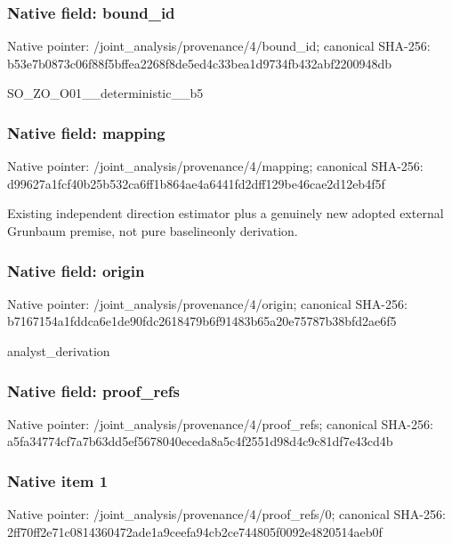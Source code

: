 \documentclass[10pt,a4paper]{article}
\begin{document}
\subsubsection{Native field: bound\_id}


Native pointer: /joint\_analysis/provenance/4/bound\_id; canonical SHA-256: b53e7b0873c06f88f5bffea2\allowbreak{}268f8de5ed4c33bea1d9734f\allowbreak{}b432abf2200948db


SO\_ZO\_O01\_\_deterministic\_\_b5


\subsubsection{Native field: mapping}


Native pointer: /joint\_analysis/provenance/4/mapping; canonical SHA-256: d99627a1fcf40b25b532ca6f\allowbreak{}f1b864ae4a6441fd2dff129b\allowbreak{}e46cae2d12eb4f5f


Existing independent direction estimator plus a genuinely new adopted external Grunbaum premise, not pure baselineonly derivation.


\subsubsection{Native field: origin}


Native pointer: /joint\_analysis/provenance/4/origin; canonical SHA-256: b7167154a1fddca6e1de90fd\allowbreak{}c2618479b6f91483b65a20e7\allowbreak{}5787b38bfd2ae6f5


analyst\_derivation


\subsubsection{Native field: proof\_refs}


Native pointer: /joint\_analysis/provenance/4/proof\_refs; canonical SHA-256: a5fa34774cf7a7b63dd5ef56\allowbreak{}78040eceda8a5c4f2551d98d\allowbreak{}4c9c81df7e43cd4b



\subsubsection{Native item 1}


Native pointer: /joint\_analysis/provenan\allowbreak{}ce/4/proof\_refs/0; canonical SHA-256: 2ff70ff2e71c0814360472ad\allowbreak{}e1a9ceefa94cb2ce744805f0\allowbreak{}092e4820514aeb0f
\end{document}
